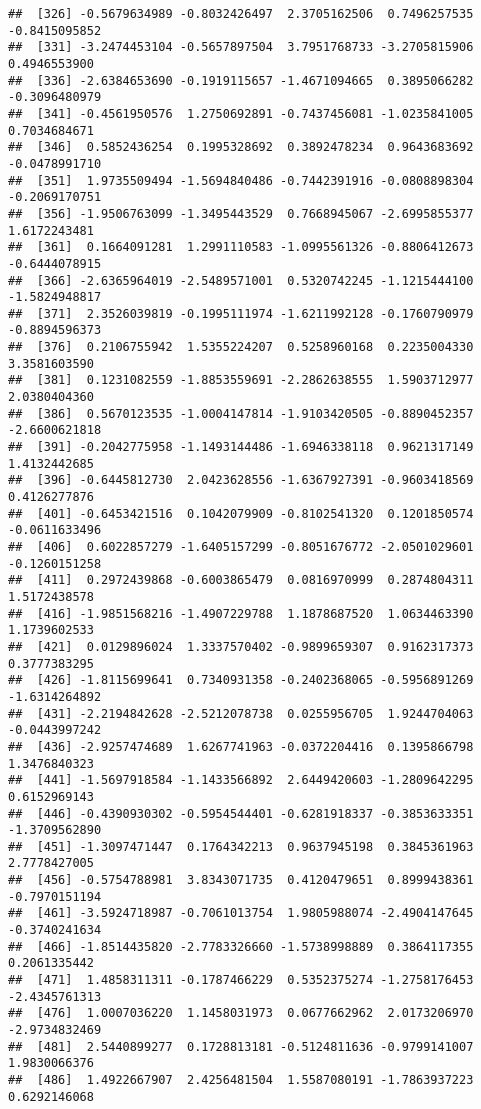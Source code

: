 \documentclass[
]{article}
\begin{document}
\begin{verbatim}
##  [326] -0.5679634989 -0.8032426497  2.3705162506  0.7496257535 -0.8415095852
##  [331] -3.2474453104 -0.5657897504  3.7951768733 -3.2705815906  0.4946553900
##  [336] -2.6384653690 -0.1919115657 -1.4671094665  0.3895066282 -0.3096480979
##  [341] -0.4561950576  1.2750692891 -0.7437456081 -1.0235841005  0.7034684671
##  [346]  0.5852436254  0.1995328692  0.3892478234  0.9643683692 -0.0478991710
##  [351]  1.9735509494 -1.5694840486 -0.7442391916 -0.0808898304 -0.2069170751
##  [356] -1.9506763099 -1.3495443529  0.7668945067 -2.6995855377  1.6172243481
##  [361]  0.1664091281  1.2991110583 -1.0995561326 -0.8806412673 -0.6444078915
##  [366] -2.6365964019 -2.5489571001  0.5320742245 -1.1215444100 -1.5824948817
##  [371]  2.3526039819 -0.1995111974 -1.6211992128 -0.1760790979 -0.8894596373
##  [376]  0.2106755942  1.5355224207  0.5258960168  0.2235004330  3.3581603590
##  [381]  0.1231082559 -1.8853559691 -2.2862638555  1.5903712977  2.0380404360
##  [386]  0.5670123535 -1.0004147814 -1.9103420505 -0.8890452357 -2.6600621818
##  [391] -0.2042775958 -1.1493144486 -1.6946338118  0.9621317149  1.4132442685
##  [396] -0.6445812730  2.0423628556 -1.6367927391 -0.9603418569  0.4126277876
##  [401] -0.6453421516  0.1042079909 -0.8102541320  0.1201850574 -0.0611633496
##  [406]  0.6022857279 -1.6405157299 -0.8051676772 -2.0501029601 -0.1260151258
##  [411]  0.2972439868 -0.6003865479  0.0816970999  0.2874804311  1.5172438578
##  [416] -1.9851568216 -1.4907229788  1.1878687520  1.0634463390  1.1739602533
##  [421]  0.0129896024  1.3337570402 -0.9899659307  0.9162317373  0.3777383295
##  [426] -1.8115699641  0.7340931358 -0.2402368065 -0.5956891269 -1.6314264892
##  [431] -2.2194842628 -2.5212078738  0.0255956705  1.9244704063 -0.0443997242
##  [436] -2.9257474689  1.6267741963 -0.0372204416  0.1395866798  1.3476840323
##  [441] -1.5697918584 -1.1433566892  2.6449420603 -1.2809642295  0.6152969143
##  [446] -0.4390930302 -0.5954544401 -0.6281918337 -0.3853633351 -1.3709562890
##  [451] -1.3097471447  0.1764342213  0.9637945198  0.3845361963  2.7778427005
##  [456] -0.5754788981  3.8343071735  0.4120479651  0.8999438361 -0.7970151194
##  [461] -3.5924718987 -0.7061013754  1.9805988074 -2.4904147645 -0.3740241634
##  [466] -1.8514435820 -2.7783326660 -1.5738998889  0.3864117355  0.2061335442
##  [471]  1.4858311311 -0.1787466229  0.5352375274 -1.2758176453 -2.4345761313
##  [476]  1.0007036220  1.1458031973  0.0677662962  2.0173206970 -2.9734832469
##  [481]  2.5440899277  0.1728813181 -0.5124811636 -0.9799141007  1.9830066376
##  [486]  1.4922667907  2.4256481504  1.5587080191 -1.7863937223  0.6292146068

\end{verbatim}
\end{document}
